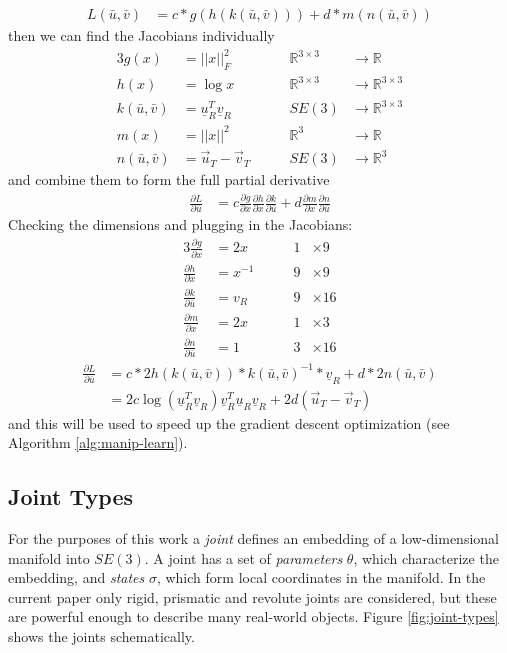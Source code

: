 \documentclass[letterpaper, 10 pt, conference]{ieeeconf}  %
\newcommand\deriv[2]{\ensuremath{\frac{\partial #1}{\partial #2}}}
\begin{document}
\begin{align}
  L(\bar{u},\bar{v}) &= c*g(h(k(\bar{u}, \bar{v}))) + d*m(n(\bar{u}, \bar{v}))
\end{align}
then we can find the Jacobians individually
\begin{alignat*}{3}
  g(x) &= ||x||_F^2 \quad\quad& \mathbb{R}^{3 \times 3} &\rightarrow \mathbb{R} \\
  h(x) &= \log{x} \quad\quad& \mathbb{R}^{3 \times 3} &\rightarrow \mathbb{R}^{3 \times 3} \\
  k(\bar{u},\bar{v}) &= \underline{u}_R^T \underline{v}_R \quad\quad& SE(3) &\rightarrow \mathbb{R}^{3 \times 3} \\
  m(x) &= ||x||^2 \quad\quad& \mathbb{R}^3 &\rightarrow \mathbb{R} \\
  n(\bar{u},\bar{v}) &= \vec{u}_T - \vec{v}_T \quad\quad& SE(3) &\rightarrow \mathbb{R}^3
\end{alignat*}
and combine them to form the full partial derivative
\begin{align}
  \deriv{L}{\bar{u}} &= c\deriv{g}{x}\deriv{h}{x}\deriv{k}{\bar{u}} + d\deriv{m}{x}\deriv{n}{\bar{u}}
\end{align}
Checking the dimensions and plugging in the Jacobians:
\begin{alignat*}{3}
  \deriv{g}{x} &= 2x \quad\quad& 1 &\times 9 \\ %
  \deriv{h}{x} &= x^{-1} \quad\quad& 9 &\times 9 \\
  \deriv{k}{\bar{u}} &= v_R \quad\quad& 9 &\times 16 \\
  \deriv{m}{x} &= 2x \quad\quad& 1 &\times 3 \\
  \deriv{n}{\bar{u}} &= 1 \quad\quad& 3 &\times 16
\end{alignat*}
\begin{align}
  \deriv{L}{\bar{u}} &= c*2h(k(\bar{u},\bar{v}))*k(\bar{u},\bar{v})^{-1}*\underline{v}_R + d*2n(\bar{u},\bar{v}) \nonumber\\
                     &= 2c\log(\underline{u}_R^T\underline{v}_R)\underline{v}_R^T\underline{u}_R\underline{v}_R + 2d(\vec{u}_T-\vec{v}_T)
\end{align}
and this will be used to speed up the gradient descent optimization (see Algorithm \ref{alg:manip-learn}).

\subsection{Joint Types}\label{sec:joint-types}
For the purposes of this work a \emph{joint} defines an embedding of a low-dimensional manifold into $SE(3)$. A joint has a set of \emph{parameters} $\theta$, which characterize the embedding, and \emph{states} $\sigma$, which form local coordinates in the manifold. In the current paper only rigid, prismatic and revolute joints are considered, but these are powerful enough to describe many real-world objects. Figure \ref{fig:joint-types} shows the joints schematically.
\end{document}
